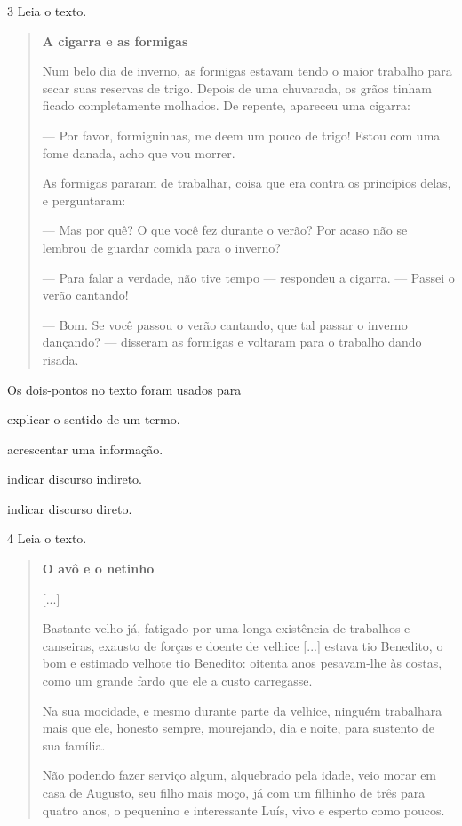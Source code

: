 \num{3} Leia o texto.

\begin{quote}
\textbf{A cigarra e as formigas}

Num belo dia de inverno, as formigas estavam tendo o maior
trabalho para secar suas reservas de trigo. Depois de uma
chuvarada, os grãos tinham ficado completamente molhados. De
repente, apareceu uma cigarra:

--- Por favor, formiguinhas, me deem um pouco de
trigo! Estou com uma fome danada, acho que vou morrer.

As formigas pararam de trabalhar, coisa que era contra
os princípios delas, e perguntaram:

--- Mas por quê? O que você fez durante o verão? Por
acaso não se lembrou de guardar comida para o inverno?

--- Para falar a verdade, não tive tempo --- respondeu
a cigarra. --- Passei o verão cantando!

--- Bom. Se você passou o verão cantando, que tal
passar o inverno dançando? --- disseram as formigas e
voltaram para o trabalho dando risada.

\end{quote}

Os dois-pontos no texto foram usados para

\begin{escolha}
\item explicar o sentido de um termo.

\item acrescentar uma informação.

\item indicar discurso indireto.

\item indicar discurso direto.
\end{escolha}



\num{4} Leia o texto.

\begin{quote}
\textbf{O avô e o netinho}

{[}...{]}

Bastante velho já, fatigado por uma longa existência de trabalhos e
canseiras, exausto de forças e doente de velhice {[}...{]} estava tio Benedito, o bom e estimado velhote tio
Benedito: oitenta anos pesavam-lhe às costas, como um grande fardo que
ele a custo carregasse.

Na sua mocidade, e mesmo durante parte da velhice, ninguém trabalhara
mais que ele, honesto sempre, mourejando, dia e noite, para sustento de
sua família.

Não podendo fazer serviço algum, alquebrado pela idade, veio morar em
casa de Augusto, seu filho mais moço, já com um filhinho de três para
quatro anos, o pequenino e interessante Luís, vivo e esperto como
poucos.

\end{quote}

